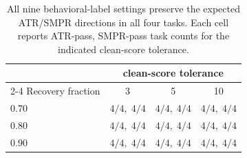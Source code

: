 \begin{table}[!htbp]
\centering
\caption{All nine behavioral-label settings preserve the expected ATR/SMPR directions in all four tasks. Each cell reports ATR-pass, SMPR-pass task counts for the indicated clean-score tolerance.}
\label{tab:threshold-quantile-sensitivity}
\small
\setlength{\tabcolsep}{7pt}
\begin{tabular}{lccc}
\toprule
& \multicolumn{3}{c}{clean-score tolerance} \\
\cmidrule(lr){2-4}
Recovery fraction & 3 & 5 & 10 \\
\midrule
$0.70$ & $4/4,\;4/4$ & $4/4,\;4/4$ & $4/4,\;4/4$ \\
$0.80$ & $4/4,\;4/4$ & $4/4,\;4/4$ & $4/4,\;4/4$ \\
$0.90$ & $4/4,\;4/4$ & $4/4,\;4/4$ & $4/4,\;4/4$ \\
\bottomrule
\end{tabular}
\end{table}
